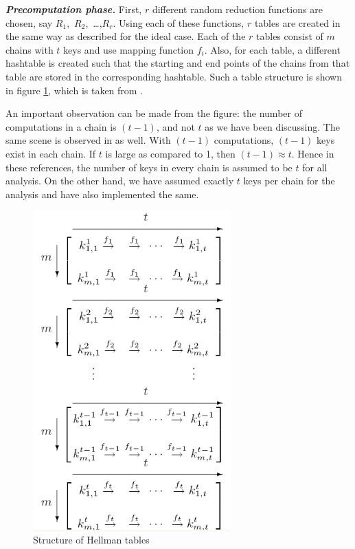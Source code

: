 \noindent \textit{\textbf{Precomputation phase.}} First, $r$ different random reduction functions are chosen, say \mbox{$R_1$, $R_2$, \ldots ,$R_r$}. Using each of these functions, $r$ tables are created in the same way as described for the ideal case. Each of the $r$ tables consist of $m$ chains with $t$ keys and use mapping function $f_i$. Also, for each table, a different hashtable is created such that the starting and end points of the chains from that table are stored in the corresponding hashtable. Such a table structure is shown in figure \ref{fig:hellman-tables}, which is taken from \cite{oechslin:mfc}.

An important observation can be made from the figure: the number of computations in a chain is $(t-1)$, and not $t$ as we have been discussing. The same scene is observed in \cite{stamp2007acb} as well. With $(t-1)$ computations, $(t-1)$ keys exist in each chain. If $t$ is large as compared to 1, then $(t-1) \approx t$. Hence in these references, the number of keys in every chain is assumed to be $t$ for all analysis. On the other hand, we have assumed exactly $t$ keys per chain for the analysis and have also implemented the same.

\begin{figure}[ht!]
	\centering
		\includegraphics[width=3in]{./figures/hellman-tables.PNG}
	\caption{Structure of Hellman tables}	
	\label{fig:hellman-tables}
\end{figure}


